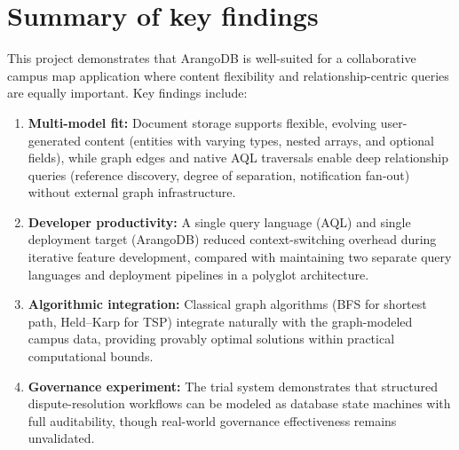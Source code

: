 \documentclass[13pt,a4paper]{report}
\begin{document}
\section{Summary of key findings}
This project demonstrates that ArangoDB is well-suited for a collaborative campus map application where content flexibility and relationship-centric queries are equally important. Key findings include:
\begin{enumerate}
    \item \textbf{Multi-model fit:} Document storage supports flexible, evolving user-generated content (entities with varying types, nested arrays, and optional fields), while graph edges and native AQL traversals enable deep relationship queries (reference discovery, degree of separation, notification fan-out) without external graph infrastructure.
    \item \textbf{Developer productivity:} A single query language (AQL) and single deployment target (ArangoDB) reduced context-switching overhead during iterative feature development, compared with maintaining two separate query languages and deployment pipelines in a polyglot architecture.
    \item \textbf{Algorithmic integration:} Classical graph algorithms (BFS for shortest path, Held--Karp for TSP) integrate naturally with the graph-modeled campus data, providing provably optimal solutions within practical computational bounds.
    \item \textbf{Governance experiment:} The trial system demonstrates that structured dispute-resolution workflows can be modeled as database state machines with full auditability, though real-world governance effectiveness remains unvalidated.
\end{enumerate}
\end{document}

